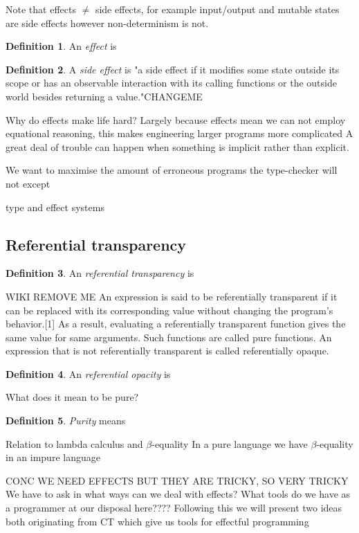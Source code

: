 \documentclass[a4paper,10pt]{article}
\theoremstyle{definition}
\newtheorem{definition}{Definition}[section]
\begin{document}
Note that effects $\neq$ side effects,
for example input/output and mutable states are side effects
however non-determinism is not.
\begin{definition}
    An \textit{effect} is
\end{definition}

\begin{definition}
    A \textit{side effect} is
"a side effect if it modifies some state outside its scope or has an observable interaction with its calling functions or the outside world besides returning a value."CHANGEME
\cite{hughes1989functional}
\end{definition}

Why do effects make life hard?
Largely because effects mean we can not employ equational reasoning,
this makes engineering larger programs more complicated
A great deal of trouble can happen when something is implicit
rather than explicit.

We want to maximise the amount of erroneous programs the type-checker will not except

type and effect systems
\cite{nielson1999type}

\subsection{Referential transparency}
\begin{definition}
    An \textit{referential transparency} is
\end{definition}
WIKI REMOVE ME
An expression is said to be referentially transparent if it can be replaced with its corresponding value without changing the program's behavior.[1] As a result, evaluating a referentially transparent function gives the same value for same arguments. Such functions are called pure functions. An expression that is not referentially transparent is called referentially opaque.
\begin{definition}
    An \textit{referential opacity} is
\end{definition}

What does it mean to be pure?
\begin{definition}
    \textit{Purity} means
\end{definition}

Relation to lambda calculus and $\beta$-equality
In a pure language we have $\beta$-equality
in an impure language 

CONC WE NEED EFFECTS BUT THEY ARE TRICKY, SO VERY TRICKY
We have to ask in what ways can we deal with effects?
What tools do we have as a programmer at our disposal here????
Following this we will present two ideas both originating from CT
which give us tools for effectful programming
\end{document}
